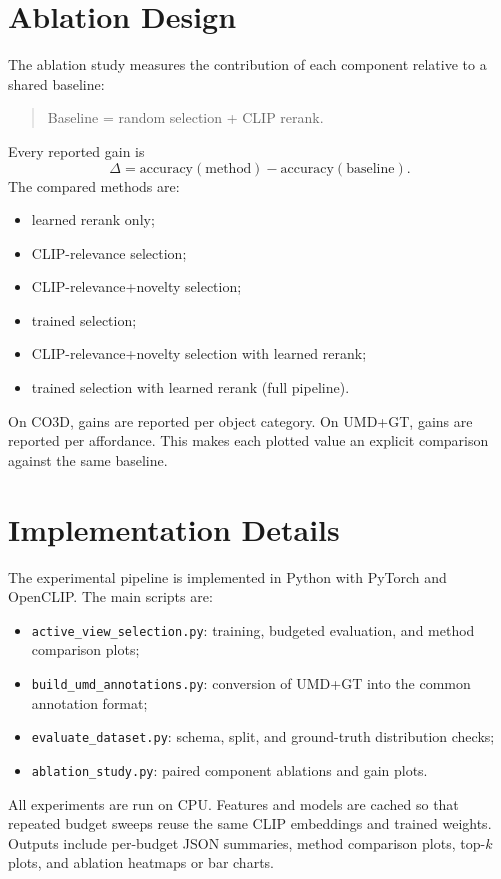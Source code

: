 \section{Ablation Design}

The ablation study measures the contribution of each component relative to a shared baseline:
\begin{quote}
Baseline = random selection + CLIP rerank.
\end{quote}
Every reported gain is
\[
\Delta = \mathrm{accuracy}(\mathrm{method}) - \mathrm{accuracy}(\mathrm{baseline}).
\]
The compared methods are:

\begin{itemize}
    \item learned rerank only;
    \item CLIP-relevance selection;
    \item CLIP-relevance+novelty selection;
    \item trained selection;
    \item CLIP-relevance+novelty selection with learned rerank;
    \item trained selection with learned rerank (full pipeline).
\end{itemize}

On CO3D, gains are reported per object category. On UMD+GT, gains are reported per affordance. This makes each plotted value an explicit comparison against the same baseline.

\section{Implementation Details}

The experimental pipeline is implemented in Python with PyTorch and OpenCLIP. The main scripts are:

\begin{itemize}
    \item \texttt{active\_view\_selection.py}: training, budgeted evaluation, and method comparison plots;
    \item \texttt{build\_umd\_annotations.py}: conversion of UMD+GT into the common annotation format;
    \item \texttt{evaluate\_dataset.py}: schema, split, and ground-truth distribution checks;
    \item \texttt{ablation\_study.py}: paired component ablations and gain plots.
\end{itemize}

All experiments are run on CPU. Features and models are cached so that repeated budget sweeps reuse the same CLIP embeddings and trained weights. Outputs include per-budget JSON summaries, method comparison plots, top-\(k\) plots, and ablation heatmaps or bar charts.

